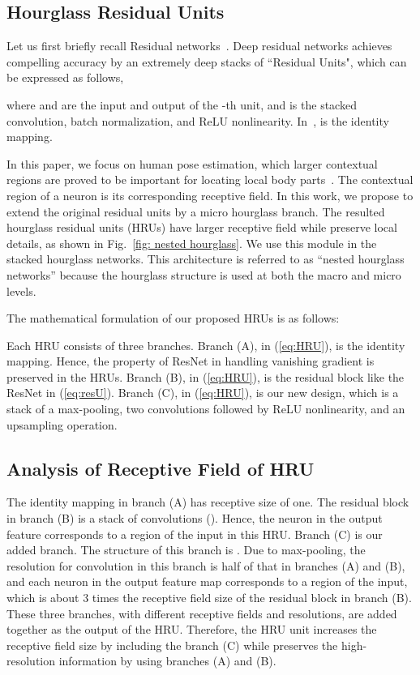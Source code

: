 \documentclass[10pt,twocolumn,letterpaper]{article}
\begin{document}
\subsection{Hourglass Residual Units}

Let us first briefly recall Residual networks~\cite{he2016deep}.
Deep residual networks achieves compelling accuracy by an extremely deep stacks of ``Residual Units", which can be expressed as follows,

where  and  are the input and output of the -th unit, 
and  is the stacked convolution, batch normalization, and ReLU nonlinearity. 
In~\cite{he2016deep},  is the identity mapping.

In this paper, we focus on human pose estimation, which larger contextual regions are proved to be important for locating local body parts~\cite{wei2016convolutional,newell2016stacked}. 
The contextual region of a neuron is its corresponding receptive field. 
In this work, we propose to extend the original residual units by a micro hourglass branch. The resulted hourglass residual units (HRUs) have larger receptive field while preserve local details, as shown in Fig.~\ref{fig: nested hourglass}. We use this module in the stacked hourglass networks.
This architecture is referred to as ``nested hourglass networks'' because the hourglass structure is used at both the macro and micro levels. 
 
The mathematical formulation of our proposed HRUs is as follows:

Each HRU consists of three branches.
Branch (A), \ie  in (\ref{eq:HRU}), is the identity mapping. Hence, the property of ResNet in handling vanishing gradient is preserved in the HRUs.
Branch (B), \ie  in (\ref{eq:HRU}),  is the residual block like the ResNet in (\ref{eq:resU}). 
Branch (C), \ie  in (\ref{eq:HRU}), is our new design, which is a stack of a  max-pooling,  two  convolutions followed by ReLU nonlinearity, and an upsampling operation. 


\subsection{Analysis of Receptive Field of HRU}
The identity mapping in branch (A) has receptive size of one.
The residual block in branch (B) is a stack of convolutions ().
Hence, the neuron in the output feature corresponds to a  region of the input in this HRU. 
Branch (C) is our added branch. The structure of this branch is . 
Due to max-pooling, the resolution for convolution in this branch is half of that in branches (A) and (B), and each neuron in the output feature map corresponds to a  region of the input, which is about 3 times the receptive field size of the residual block in branch (B).
These three branches, with different receptive fields and resolutions, are added together as the output of the HRU. 
Therefore, the HRU unit increases the receptive field size by including the branch (C) while preserves the high-resolution information by using branches (A) and (B). 
\end{document}
